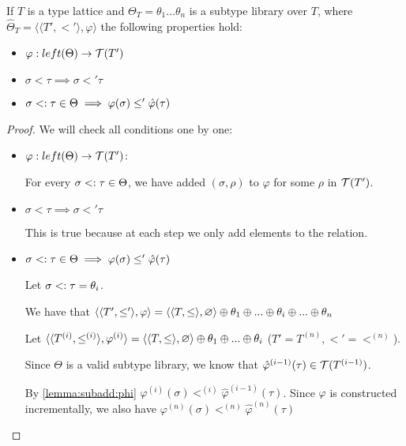 \documentclass[main.tex]{subfiles}
\begin{document}
\begin{prop}
    If $T$ is a type lattice and
    $\Theta_T = \theta_1 ... \theta_n$ is a subtype library over $T$, where
    $\hat{\Theta}_T = \langle \langle T', \less' \rangle, \varphi \rangle$
    the following properties hold:
    \begin{itemize}
        \item $\varphi : left(\Theta) \rightarrow \mathcal{T}( T' )$
        \item $\sigma \less \tau \implies \sigma \less' \tau$
        \item $\sigma <: \tau \in \Theta \implies \varphi(\sigma) \leq' \hat{\varphi}(\tau)$
    \end{itemize}
\end{prop}
\begin{proof}
    We will check all conditions one by one:
    \begin{itemize}
        \item $\varphi : left(\Theta) \rightarrow \mathcal{T}( T' )$:

            For every $\sigma <: \tau \in \Theta$, we have added
            $(\sigma, \rho)$ to $\varphi$ for some $\rho$ in $\mathcal{T}( T' )$.

        \item $\sigma \less \tau \implies \sigma \less' \tau$

            This is true because
            at each step we only add elements to the relation.
        \item $\sigma <: \tau \in \Theta \implies \varphi(\sigma) \leq' \hat{\varphi}(\tau)$

            Let $\sigma <: \tau = \theta_i$.

            We have that
            $\langle \langle T', \leq' \rangle, \varphi \rangle
                = \langle \langle T, \leq \rangle, \varnothing \rangle
                \oplus \theta_1 \oplus ... \oplus \theta_i \oplus ... \oplus \theta_n$

            Let
            $\langle \langle T^{(i)}, \leq^{(i)} \rangle, \varphi^{(i)} \rangle
                = \langle \langle T, \leq \rangle, \varnothing \rangle
                \oplus \theta_1 \oplus ... \oplus \theta_i$ \quad ($T' = T^{(n)},
                \less' = \less^{(n)}$).

            Since $\Theta$ is a valid subtype library, we know that
            $\hat{\varphi}^{(i - 1)}(\tau) \in \mathcal{T}( T^{(i - 1)} )$.

            By \cref{lemma:subadd:phi} $\varphi^{(i)}(\sigma) \less^{(i)}
            \hat{\varphi}^{(i - 1)}(\tau)$. Since $\varphi$ is constructed
            incrementally, we also have $\varphi^{(n)}(\sigma) \less^{(n)}
            \hat{\varphi}^{(n)}(\tau)$
    \end{itemize}
\end{proof}
\end{document}
